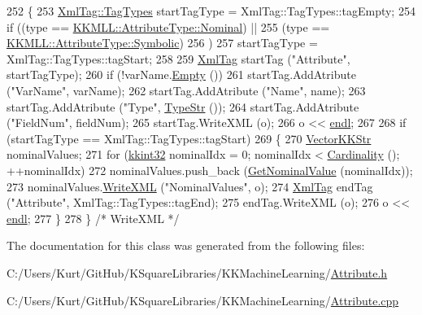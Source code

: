 \begin{DoxyCode}
252 \{
253   \hyperlink{class_k_k_b_1_1_xml_tag_a6c0ef0e23f982f49d55d4fb7eaff6ac9}{XmlTag::TagTypes}  startTagType = XmlTag::TagTypes::tagEmpty;
254   \textcolor{keywordflow}{if}  ((type == \hyperlink{namespace_k_k_m_l_l_a99973706982b59debba670e2480555aba8c28d7c312116b8a46e2f466cb33d5b4}{KKMLL::AttributeType::Nominal}) ||
255        (type == \hyperlink{namespace_k_k_m_l_l_a99973706982b59debba670e2480555abaaddee1396a3e20ceea8071ed6da54866}{KKMLL::AttributeType::Symbolic})
256       )
257     startTagType  = XmlTag::TagTypes::tagStart;
258 
259   \hyperlink{class_k_k_b_1_1_xml_tag}{XmlTag}  startTag (\textcolor{stringliteral}{"Attribute"}, startTagType);
260   \textcolor{keywordflow}{if}  (!varName.\hyperlink{class_k_k_b_1_1_k_k_str_ac69942f73fffd672ec2a6e1c410afdb6}{Empty} ())
261     startTag.AddAtribute (\textcolor{stringliteral}{"VarName"}, varName);
262   startTag.AddAtribute (\textcolor{stringliteral}{"Name"},     name);
263   startTag.AddAtribute (\textcolor{stringliteral}{"Type"},     \hyperlink{class_k_k_m_l_l_1_1_attribute_a37e2ba1b7741ce73ecdf3bda24be3e11}{TypeStr} ());
264   startTag.AddAtribute (\textcolor{stringliteral}{"FieldNum"}, fieldNum);
265   startTag.WriteXML (o);
266   o << \hyperlink{namespace_k_k_b_ad1f50f65af6adc8fa9e6f62d007818a8}{endl};
267 
268   \textcolor{keywordflow}{if}  (startTagType == XmlTag::TagTypes::tagStart)
269   \{
270     \hyperlink{class_k_k_b_1_1_vector_k_k_str}{VectorKKStr}  nominalValues;
271     \textcolor{keywordflow}{for}  (\hyperlink{namespace_k_k_b_a8fa4952cc84fda1de4bec1fbdd8d5b1b}{kkint32}  nominalIdx = 0;  nominalIdx < \hyperlink{class_k_k_m_l_l_1_1_attribute_a7a7e8d04e3a93b47f6c2d1f99f0e42c6}{Cardinality} ();  ++nominalIdx)
272       nominalValues.push\_back (\hyperlink{class_k_k_m_l_l_1_1_attribute_ad9342fb254fb972f63825f8d5be25311}{GetNominalValue} (nominalIdx));
273     nominalValues.\hyperlink{class_k_k_b_1_1_vector_k_k_str_a3e90bf5fd9c23a8c16f0fdee98946395}{WriteXML} (\textcolor{stringliteral}{"NominalValues"}, o);
274     \hyperlink{class_k_k_b_1_1_xml_tag}{XmlTag}  endTag (\textcolor{stringliteral}{"Attribute"}, XmlTag::TagTypes::tagEnd);
275     endTag.WriteXML (o);
276     o << \hyperlink{namespace_k_k_b_ad1f50f65af6adc8fa9e6f62d007818a8}{endl};
277   \}
278 \}  \textcolor{comment}{/* WriteXML */}
\end{DoxyCode}


The documentation for this class was generated from the following files\+:\begin{DoxyCompactItemize}
\item 
C\+:/\+Users/\+Kurt/\+Git\+Hub/\+K\+Square\+Libraries/\+K\+K\+Machine\+Learning/\hyperlink{_attribute_8h}{Attribute.\+h}\item 
C\+:/\+Users/\+Kurt/\+Git\+Hub/\+K\+Square\+Libraries/\+K\+K\+Machine\+Learning/\hyperlink{_attribute_8cpp}{Attribute.\+cpp}\end{DoxyCompactItemize}
